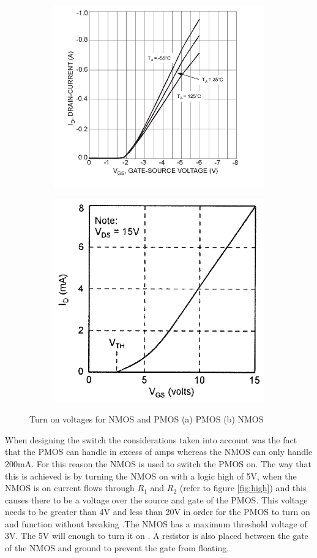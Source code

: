\begin{figure}[!htb]
 \footnotesize
 \centering
    \begin{subfigure}[]{0.55\textwidth}
              \centering
  		\includegraphics[width=0.5\linewidth]{./Figures/PMOS.png}
		    \caption{} \label{subfig:PMOS-graph}
     \end{subfigure}
     \begin{subfigure}[]{0.4\textwidth}
             \centering
  		\includegraphics[width=0.6\linewidth]{./Figures/NMOS.jpg}
		   \caption{ } \label{subfig:NMOS-graph}
     \end{subfigure}
   \caption[{$V_{GS}$  vs  $I_{D}$}]{Turn on voltages for NMOS and PMOS (a)  PMOS \cite{PMOS}(b)  NMOS\cite{NMOS}  }
    \label{fig:simulation_results_box}
 \end{figure}




 When designing the switch the considerations taken into account was the fact that the PMOS can handle in excess of amps \cite{PMOS} whereas the NMOS can only handle 200mA\cite{NData}. For this reason the NMOS is used to switch the PMOS on. The way that this is achieved is by turning the NMOS on with a logic high of 5V, when the NMOS is on current flows through $R_1$ and $R_2$ (refer to figure \ref{fig:high}) and this causes there to be a voltage over the source and gate of the PMOS. This voltage needs to be greater than 4V and less than 20V in order for the PMOS to turn on and function without breaking \cite{PMOS}.The NMOS has a maximum threshold voltage of 3V. The 5V will enough to turn it on \cite{NMOS}. A resistor is also placed between the gate of the NMOS and ground to prevent the gate from floating. 
 

